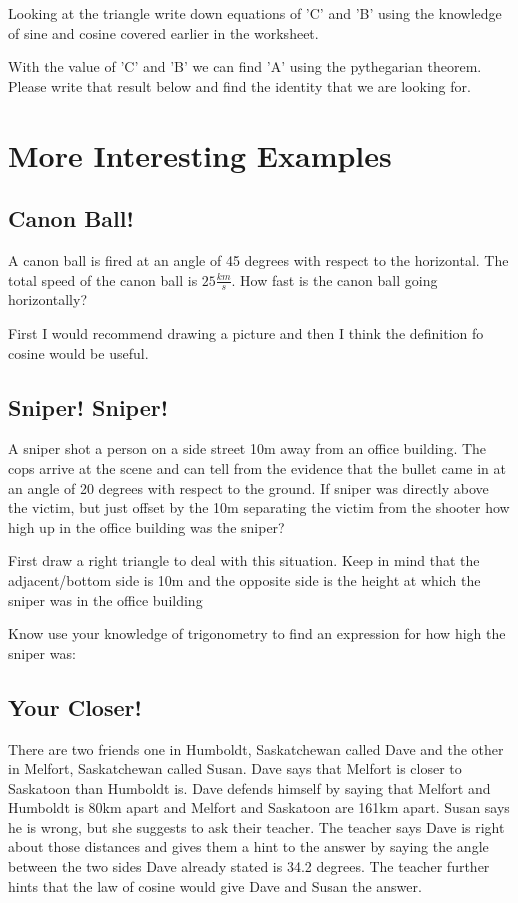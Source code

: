 \documentclass[12pt]{article}
\begin{document}
Looking at the triangle write down equations of 'C' and 'B' using the knowledge of sine and cosine covered earlier in the worksheet.

\parbox[][4cm][t]{8cm}{}

With the value of 'C' and 'B' we can find 'A' using the pythegarian theorem. Please write that result below and find the identity that we are looking for.

\parbox[][6cm][t]{8cm}{}

\section{More Interesting Examples}

\subsection{Canon Ball!}
A canon ball is fired at an angle of 45 degrees with respect to the horizontal. The total speed of the canon ball is $25 \frac{km}{s}$. How fast is the canon ball going horizontally?

First I would recommend drawing a picture and then I think the definition fo cosine would be useful.

\parbox[][6cm][t]{8cm}{}


\subsection{Sniper! Sniper!}
A sniper shot a person on a side street 10m away from an office building. The cops arrive at the scene and can tell from the evidence that the bullet came in at an angle of 20 degrees with respect to the ground. If sniper was directly above the victim, but just offset by the 10m separating the victim from the shooter how high up in the office building was the sniper?

First draw a right triangle to deal with this situation. Keep in mind that the adjacent/bottom side is 10m and the opposite side is the height at which the sniper was in the office building

\parbox[][6cm][t]{8cm}{}

Know use your knowledge of trigonometry to find an expression for how high the sniper was:

\parbox[][6cm][t]{8cm}{}

\subsection{Your Closer!}
There are two friends one in Humboldt, Saskatchewan called Dave and the other in Melfort, Saskatchewan called Susan. Dave says that Melfort is closer to Saskatoon than Humboldt is. Dave defends himself by saying that Melfort and Humboldt is 80km apart and Melfort and Saskatoon are 161km apart. Susan says he is wrong, but she suggests to ask their teacher. The teacher says Dave is right about those distances and gives them a hint to the answer by saying the angle between the two sides Dave already stated is 34.2 degrees. The teacher further hints that the law of cosine would give Dave and Susan the answer.
\end{document}
